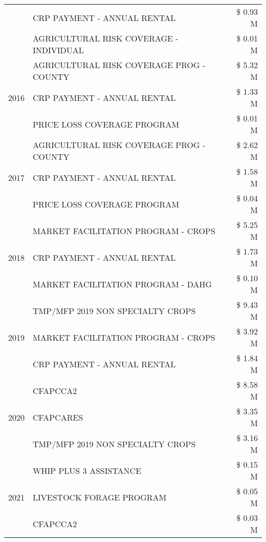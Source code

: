 \begin{tabular}{llr}
 & CRP PAYMENT - ANNUAL RENTAL & \$ 0.93 M \\
 & AGRICULTURAL RISK COVERAGE - INDIVIDUAL & \$ 0.01 M \\
\cline{1-3}
\multirow[t]{3}{*}{2016} & AGRICULTURAL RISK COVERAGE PROG - COUNTY & \$ 5.32 M \\
 & CRP PAYMENT - ANNUAL RENTAL & \$ 1.33 M \\
 & PRICE LOSS COVERAGE PROGRAM & \$ 0.01 M \\
\cline{1-3}
\multirow[t]{3}{*}{2017} & AGRICULTURAL RISK COVERAGE PROG - COUNTY & \$ 2.62 M \\
 & CRP PAYMENT - ANNUAL RENTAL & \$ 1.58 M \\
 & PRICE LOSS COVERAGE PROGRAM & \$ 0.04 M \\
\cline{1-3}
\multirow[t]{3}{*}{2018} & MARKET FACILITATION PROGRAM - CROPS & \$ 5.25 M \\
 & CRP PAYMENT - ANNUAL RENTAL & \$ 1.73 M \\
 & MARKET FACILITATION PROGRAM - DAHG & \$ 0.10 M \\
\cline{1-3}
\multirow[t]{3}{*}{2019} & TMP/MFP 2019 NON SPECIALTY CROPS & \$ 9.43 M \\
 & MARKET FACILITATION PROGRAM - CROPS & \$ 3.92 M \\
 & CRP PAYMENT - ANNUAL RENTAL & \$ 1.84 M \\
\cline{1-3}
\multirow[t]{3}{*}{2020} & CFAPCCA2 & \$ 8.58 M \\
 & CFAPCARES & \$ 3.35 M \\
 & TMP/MFP 2019 NON SPECIALTY CROPS & \$ 3.16 M \\
\cline{1-3}
\multirow[t]{3}{*}{2021} & WHIP PLUS 3 ASSISTANCE & \$ 0.15 M \\
 & LIVESTOCK FORAGE PROGRAM & \$ 0.05 M \\
 & CFAPCCA2 & \$ 0.03 M \\
\cline{1-3}
\bottomrule
\end{tabular}
